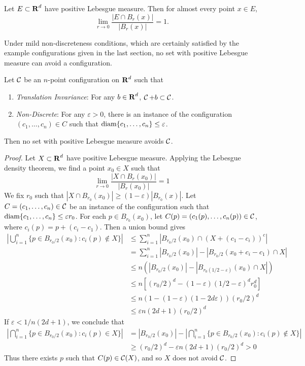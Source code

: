\begin{theorem}
	Let $E \subset \operatorname{\mathbf{R}}^d$ have positive Lebesgue measure. Then for almost every point $x \in E$,
	\[ \lim_{r \to 0} \frac{|E \cap B_r(x)|}{|B_r(x)|} = 1. \]
\end{theorem}

Under mild non-discreteness conditions, which are certainly satisfied by the example configurations given in the last section, no set with positive Lebesgue measure can avoid a configuration.

\begin{theorem}
	Let $\operatorname{\mathcal{C}}$ be an $n$-point configuration on $\operatorname{\mathbf{R}}^d$ such that
	\begin{enumerate}
		\item \emph{Translation Invariance}: For any $b \in \operatorname{\mathbf{R}}^d$, $\operatorname{\mathcal{C}} + b \subset \operatorname{\mathcal{C}}$.
		\item \emph{Non-Discrete}: For any $\varepsilon > 0$, there is an instance of the configuration $(c_1, \dots, c_n) \in C$ such that $\operatorname{\text{diam}} \{ c_1, \dots, c_n \} \leq \varepsilon$.
	\end{enumerate}
	Then no set with positive Lebesgue measure avoids $\operatorname{\mathcal{C}}$.
\end{theorem}
\begin{proof}
	Let $X \subset \operatorname{\mathbf{R}}^d$ have positive Lebesgue measure. Applying the Lebesgue density theorem, we find a point $x_0 \in X$ such that
	\[ \lim_{r \to 0} \frac{|X \cap B_r(x_0)|}{|B_r(x_0)|} = 1 \]
	We fix $r_0$ such that $|X \cap B_{r_0}(x_0)| \geq (1 - \varepsilon)|B_{r_0}(x)|$. Let $C = (c_1, \dots, c_n) \in \operatorname{\mathcal{C}}$ be an instance of the configuration such that $\operatorname{\text{diam}} \{ c_1, \dots, c_n \} \leq \varepsilon r_0$. For each $p \in B_{r_0}(x_0)$, let $C(p) = (c_1(p), \dots, c_n(p)) \in \operatorname{\mathcal{C}}$, where $c_i(p) = p + (c_i - c_1)$. Then a union bound gives
	\begin{align*}
		\left| \bigcup_{i = 1}^n \{ p \in B_{r_0/2}(x_0) : c_i(p) \not \in X \} \right| &\leq \sum_{i = 1}^n |B_{r_0/2}(x_0) \cap (X + (c_1 - c_i))^c|\\
		&= \sum_{i = 1}^n |B_{r_0/2}(x_0)| - |B_{r_0/2}(x_0 + c_i - c_1) \cap X|\\
		&\leq n \left( |B_{r_0/2}(x_0)| - |B_{r_0(1/2 - \varepsilon)}(x_0) \cap X| \right)\\
		&\leq n \left[ (r_0/2)^d - (1 - \varepsilon)(1/2 - \varepsilon)^d r_0^d \right] \\
		&\leq n \left( 1 - (1 - \varepsilon) (1 - 2d\varepsilon) \right) (r_0/2)^d\\
		&\leq \varepsilon n (2d + 1) (r_0/2)^d
	\end{align*}
	If $\varepsilon < 1/n(2d + 1)$, we conclude that
	\begin{align*}
		\left| \bigcap_{i = 1}^n \{ p \in B_{r_0/2}(x_0) : c_i(p) \in X \} \right| &= |B_{r_0/2}(x_0)| - \left| \bigcap_{i = 1}^n \{ p \in B_{r_0/2}(x_0) : c_i(p) \not \in X \} \right|\\
		&\geq (r_0/2)^d - \varepsilon n(2d + 1) (r_0/2)^d > 0
	\end{align*}
	Thus there exists $p$ such that $C(p) \in \operatorname{\mathcal{C}}(X)$, and so $X$ does not avoid $\operatorname{\mathcal{C}}$.
\end{proof}

